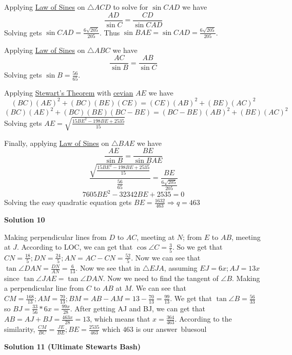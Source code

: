 \begin{enumerate}
 Applying \href{https://artofproblemsolving.com/wiki/index.php?title=Law\_of\_Sines}{Law of Sines} on $\bigtriangleup ACD$ to solve for $\sin CAD$ we have
 \[\frac{AD}{\sin C}=\frac{CD}{\sin CAD}\]Solving gets $\sin CAD=\frac{6\sqrt{205}}{205}$. Thus $\sin BAE=\sin CAD=\frac{6\sqrt{205}}{205}$.

 Applying \href{https://artofproblemsolving.com/wiki/index.php?title=Law\_of\_Sines}{Law of Sines} on $\bigtriangleup ABC$ we have
 \[\frac{AC}{\sin B}=\frac{AB}{\sin C}\]Solving gets $\sin B=\frac{56}{65}$.

 Applying \href{https://artofproblemsolving.com/wiki/index.php?title=Stewart\%27s\_Theorem}{Stewart's Theorem} with \href{https://artofproblemsolving.com/wiki/index.php?title=Cevian}{cevian} $AE$ we have
 \[(BC)(AE)^2+(BC)(BE)(CE)=(CE)(AB)^2+(BE)(AC)^2\]
 \[(BC)(AE)^2+(BC)(BE)(BC-BE)=(BC-BE)(AB)^2+(BE)(AC)^2\]Solving gets $AE=\sqrt{\frac{15BE^2-198BE+2535}{15}}$

 Finally, applying \href{https://artofproblemsolving.com/wiki/index.php?title=Law\_of\_Sines}{Law of Sines} on $\bigtriangleup BAE$ we have
 \[\frac{AE}{\sin B}=\frac{BE}{\sin BAE}\]
 \[\frac{\sqrt{\frac{15BE^2-198BE+2535}{15}}}{\frac{56}{65}}=\frac{BE}{\frac{6\sqrt{205}}{205}}\]
 \[7605BE^2-32342BE+2535=0\]Solving the easy quadratic equation gets $BE=\frac{1632}{463}\Longrightarrow q=\boxed{463}$




\textbf{Solution 10}

Making perpendicular lines from $D$ to $AC$, meeting at $N$; from $E$ to $AB$, meeting at $J$. According to LOC, we can get that $\cos\angle{C}=\frac{3}{5}$. So we get that $CN=\frac{18}{5};DN=\frac{24}{5};AN=AC-CN=\frac{52}{5}$. Now we can see that $\tan\angle{DAN}=\frac{DN}{AN}=\frac{6}{13}$. Now we see that in $\triangle{EJA}$, assuming $EJ=6x;AJ=13x$ since $\tan\angle{JAE}=\tan\angle{DAN}$. Now we need to find the tangent of $\angle{B}$. Making a perpendicular line from $C$ to $AB$ at $M$. We can see that $CM=\frac{168}{13};AM=\frac{70}{13};BM=AB-AM=13-\frac{70}{13}=\frac{99}{13}$. We get that $\tan\angle{B}=\frac{56}{33}$ so $BJ=\frac{33}{56}*6x=\frac{99x}{28}$. After getting AJ and BJ, we can get that $AB=AJ+BJ=\frac{463x}{28}=13$, which means that $x=\frac{364}{463}$. According to the similarity, $\frac{CM}{BC}=\frac{JE}{BE};BE=\frac{2535}{463}$ which $\boxed{463}$ is our answer~bluesoul

 



\textbf{Solution 11 (Ultimate Stewarts Bash)}


\end{enumerate}

